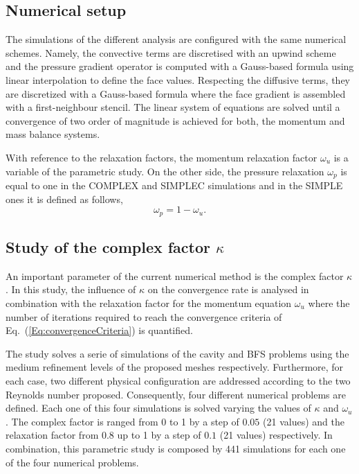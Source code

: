 \documentclass[final,3p,times,11pt,onecolumn]{myElsarticle}
\numberwithin{equation}{section}
\begin{document}
\subsection{Numerical setup}
The simulations of the different analysis are configured with the same numerical schemes. Namely, the convective terms are discretised with an upwind scheme and the pressure gradient operator is computed with a Gauss-based formula using linear interpolation to define the face values. Respecting the diffusive terms, they are discretized with a Gauss-based formula where the face gradient is assembled with a first-neighbour stencil. The linear system of equations are solved until a convergence of two order of magnitude is achieved for both, the momentum and mass balance systems. 

With reference to the relaxation factors, the momentum relaxation factor $\omega_u$ is a variable of the parametric study. On the other side, the pressure relaxation $\omega_p$ is equal to one in the COMPLEX and SIMPLEC simulations and in the SIMPLE ones it is defined as follows,
\begin{equation}
\label{Eq:relaxP}
\omega_p = 1 - \omega_u.
\end{equation}

  

\subsection{Study of the complex factor $\kappa$}
An important parameter of the current numerical method is the complex factor $\kappa$. In this study, the influence  of $\kappa$ on the convergence rate is analysed in combination with the relaxation factor for the momentum equation $\omega_{u}$ where the number of iterations required to reach the convergence criteria of Eq.~(\ref{Eq:convergenceCriteria}) is quantified.

The study solves a serie of simulations of the cavity and BFS problems using the medium refinement levels of the proposed meshes respectively. Furthermore, for each case, two different physical configuration are addressed according to the two Reynolds number proposed. Consequently, four different numerical problems are defined. Each one of this four simulations is solved varying the values of $\kappa$ and $\omega_{u}$. The complex factor is ranged from 0 to 1 by a step of $0.05$ (21 values) and the relaxation factor from 0.8 up to 1 by a step of $0.1$ (21 values) respectively. In combination, this parametric study is composed by 441 simulations for each one of the four numerical problems.
\end{document}
